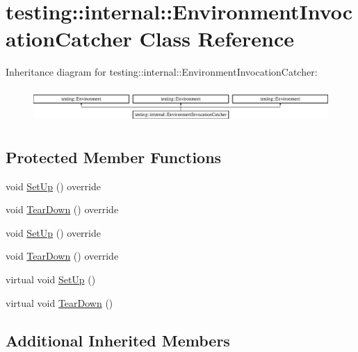 \hypertarget{classtesting_1_1internal_1_1_environment_invocation_catcher}{}\section{testing\+::internal\+::Environment\+Invocation\+Catcher Class Reference}
\label{classtesting_1_1internal_1_1_environment_invocation_catcher}
Inheritance diagram for testing\+::internal\+::Environment\+Invocation\+Catcher\+:\begin{figure}[H]
\begin{center}
\leavevmode
\includegraphics[height=1.319199cm]{d5/d0f/classtesting_1_1internal_1_1_environment_invocation_catcher}
\end{center}
\end{figure}
\subsection*{Protected Member Functions}
\begin{DoxyCompactItemize}
\item 
void \mbox{\hyperlink{classtesting_1_1internal_1_1_environment_invocation_catcher_a95400d20847acd38742ba372f87240dc}{Set\+Up}} () override
\item 
void \mbox{\hyperlink{classtesting_1_1internal_1_1_environment_invocation_catcher_a50097d7cb8997fef0e2df90a564949f0}{Tear\+Down}} () override
\item 
void \mbox{\hyperlink{classtesting_1_1internal_1_1_environment_invocation_catcher_a95400d20847acd38742ba372f87240dc}{Set\+Up}} () override
\item 
void \mbox{\hyperlink{classtesting_1_1internal_1_1_environment_invocation_catcher_a50097d7cb8997fef0e2df90a564949f0}{Tear\+Down}} () override
\item 
virtual void \mbox{\hyperlink{classtesting_1_1internal_1_1_environment_invocation_catcher_a325365b0ecfa71a4a767d7a1817c9663}{Set\+Up}} ()
\item 
virtual void \mbox{\hyperlink{classtesting_1_1internal_1_1_environment_invocation_catcher_afc89ee0a8e32e6746a89fcc1682f62e9}{Tear\+Down}} ()
\end{DoxyCompactItemize}
\subsection*{Additional Inherited Members}



